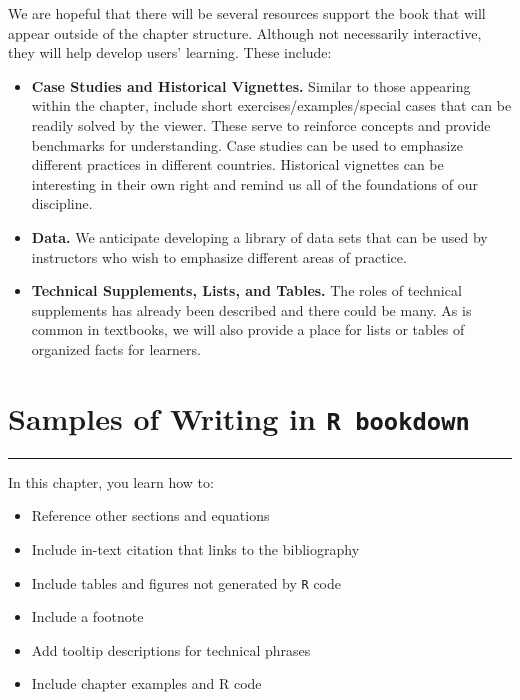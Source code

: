 \documentclass[
]{book}
\providecommand{\tightlist}{%
  \setlength{\itemsep}{0pt}\setlength{\parskip}{0pt}}
\begin{document}
We are hopeful that there will be several resources support the book that will appear outside of the chapter structure. Although not necessarily interactive, they will help develop users' learning. These include:

\begin{itemize}
\tightlist
\item
  \textbf{Case Studies and Historical Vignettes.} Similar to those appearing within the chapter, include short exercises/examples/special cases that can be readily solved by the viewer. These serve to reinforce concepts and provide benchmarks for understanding. Case studies can be used to emphasize different practices in different countries. Historical vignettes can be interesting in their own right and remind us all of the foundations of our discipline.
\item
  \textbf{Data.} We anticipate developing a library of data sets that can be used by instructors who wish to emphasize different areas of practice.
\item
  \textbf{Technical Supplements, Lists, and Tables.} The roles of technical supplements has already been described and there could be many. As is common in textbooks, we will also provide a place for lists or tables of organized facts for learners.
\end{itemize}

\hypertarget{S:SampleSection}{%
\chapter{\texorpdfstring{Samples of Writing in \texttt{R\ bookdown}}{Samples of Writing in R bookdown}}\label{S:SampleSection}}

\begin{center}\rule{0.5\linewidth}{0.5pt}\end{center}

In this chapter, you learn how to:

\begin{itemize}
\tightlist
\item
  Reference other sections and equations
\item
  Include in-text citation that links to the bibliography
\item
  Include tables and figures not generated by \texttt{R} code
\item
  Include a footnote
\item
  Add tooltip descriptions for technical phrases
\item
  Include chapter examples and R code
\end{itemize}
\end{document}
